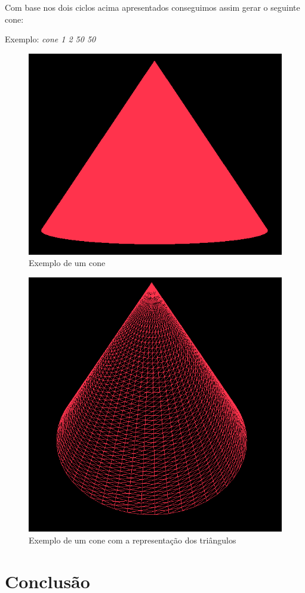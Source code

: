 \documentclass{article}
\begin{document}
Com base nos dois ciclos acima apresentados conseguimos assim gerar o seguinte cone:

Exemplo: \textit{cone 1 2 50 50}
\begin{figure}[H]
\centering\includegraphics[scale=0.45]{cone2} 
\caption{\label{fig:controller}Exemplo de um cone}
\end{figure} \begin{figure}[H]
\centering\includegraphics[scale=0.4]{cone1} 
\caption{\label{fig:controller}Exemplo de um cone com a representação dos triângulos}
\end{figure}
\newpage
\section{Conclusão}
\end{document}
